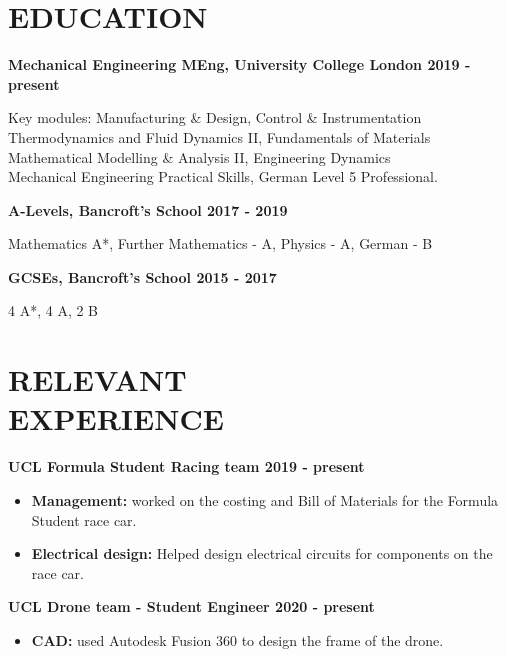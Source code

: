 \documentclass[margin, 10pt]{res} %
\begin{document}
\begin{resume}

 
\section{EDUCATION}  

\textbf{Mechanical Engineering MEng, University College London \hfill 2019 - present}

Key modules: Manufacturing \& Design, Control \& Instrumentation\\
Thermodynamics and Fluid Dynamics II, Fundamentals of Materials\\
Mathematical Modelling \& Analysis II, Engineering Dynamics\\
Mechanical Engineering Practical Skills, German Level 5 Professional.

\textbf{A-Levels, Bancroft's School \hfill 2017 - 2019}

Mathematics A*, Further Mathematics - A, Physics - A, German - B

\textbf{GCSEs, Bancroft's School
\hfill 2015 - 2017}

4 A*, 4 A, 2 B


\section{RELEVANT \\EXPERIENCE} 

\textbf{UCL Formula Student Racing team \hfill 2019 - present}
\\
\begin{itemize}
  \item \textbf{Management:} worked on the costing and Bill of Materials for the Formula Student race car.
  \item \textbf{Electrical design:} Helped design electrical circuits for components on the race car.
\end{itemize}

\textbf{UCL Drone team - Student Engineer \hfill 2020 - present}
\\
\begin{itemize}
  \item \textbf{CAD:} used Autodesk Fusion 360 to design the frame of the drone.
\end{itemize}


\end{resume}
\end{document}
